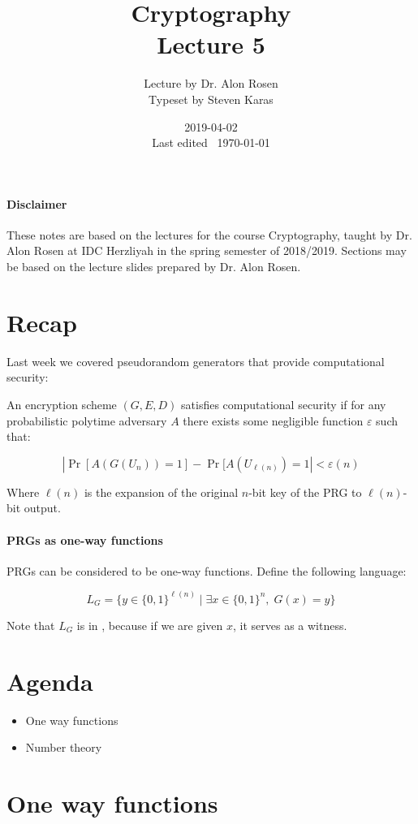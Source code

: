 \documentclass{idc_msc}
\title{Cryptography \\\large Lecture 5}
\date{2019-04-02 \\ Last edited \currenttime\ \today}
\author{Lecture by Dr. Alon Rosen\\Typeset by Steven Karas}
\let\NPclass\relax
\newcommand{\NPclass}{\texorpdfstring{\ensuremath{\mathcal{NP}}}{NP}}
\begin{document}
\paragraph{Disclaimer}

These notes are based on the lectures for the course Cryptography, taught by Dr. Alon Rosen at IDC Herzliyah in the spring semester of 2018/2019.
Sections may be based on the lecture slides prepared by Dr. Alon Rosen.

\nocite{Katz:2014:IMC:2700550}

\section{Recap}

Last week we covered pseudorandom generators that provide computational security:

An encryption scheme \((G,E,D)\) satisfies computational security if for any probabilistic polytime adversary \(A\) there exists some negligible function \(\varepsilon\) such that:

\[
  |\Pr[A(G(U_n)) = 1] - \Pr[A(U_{\ell(n)}) = 1| < \varepsilon(n)
\]

Where \(\ell(n)\) is the expansion of the original \(n\)-bit key of the PRG to \(\ell(n)\)-bit output.

\paragraph{PRGs as one-way functions}

PRGs can be considered to be one-way functions.
Define the following language:

\[
  L_G = \{y \in \{0, 1\}^{\ell(n)} \mid \exists x \in \{0, 1\}^n,\; G(x) = y\}
\]

Note that \(L_G\) is in \NPclass, because if we are given \(x\), it serves as a witness.

\section{Agenda}

\begin{itemize}
  \item One way functions
  \item Number theory
\end{itemize}

\section{One way functions}
\end{document}
